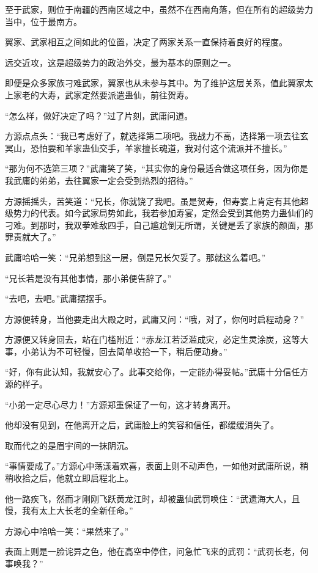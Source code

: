 \begin{this_body}
至于武家，则位于南疆的西南区域之中，虽然不在西南角落，但在所有的超级势力当中，位于最南方。

翼家、武家相互之间如此的位置，决定了两家关系一直保持着良好的程度。

远交近攻，这是超级势力的政治外交，最为基本的原则之一。

即便是众多家族刁难武家，翼家也从未参与其中。为了维护这层关系，值此翼家太上家老的大寿，武家定然要派遣蛊仙，前往贺寿。

“怎么样，做好决定了吗？”过了片刻，武庸问道。

方源点点头：“我已考虑好了，就选择第二项吧。我战力不高，选择第一项去往玄冥山，恐怕要和羊家蛊仙交手，羊家擅长魂道，我对付这个流派并不擅长。”

“那为何不选第三项？”武庸笑了笑，“其实你的身份最适合做这项任务，因为你是我武庸的弟弟，去往翼家一定会受到热烈的招待。”

方源摇摇头，苦笑道：“兄长，你就饶了我吧。虽是贺寿，但寿宴上肯定有其他超级势力的代表。如今武家局势如此，我若参加寿宴，定然会受到其他势力蛊仙们的刁难。到那时，我双拳难敌四手，自己尴尬倒无所谓，关键是丢了家族的颜面，那罪责就大了。”

武庸哈哈一笑：“兄弟想到这一层，倒是兄长欠妥了。那就这么着吧。”

“兄长若是没有其他事情，那小弟便告辞了。”

“去吧，去吧。”武庸摆摆手。

方源便转身，当他要走出大殿之时，武庸又问：“哦，对了，你何时启程动身？”

方源便又转身回去，站在门槛附近：“赤龙江若泛滥成灾，必定生灵涂炭，这等大事，小弟认为不可轻慢，回去简单收拾一下，稍后便动身。”

“好，你有此认知，我就安心了。此事交给你，一定能办得妥帖。”武庸十分信任方源的样子。

“小弟一定尽心尽力！”方源郑重保证了一句，这才转身离开。

他却没有见到，在他离开之后，武庸脸上的笑容和信任，都缓缓消失了。

取而代之的是眉宇间的一抹阴沉。

“事情要成了。”方源心中荡漾着欢喜，表面上则不动声色，一如他对武庸所说，稍稍收拾之后，他就立即启程北上。

他一路疾飞，然而才刚刚飞跃黄龙江时，却被蛊仙武罚唤住：“武遗海大人，且慢，我有太上大长老的全新任命。”

方源心中哈哈一笑：“果然来了。”

表面上则是一脸诧异之色，他在高空中停住，问急忙飞来的武罚：“武罚长老，何事唤我？”


\end{this_body}

